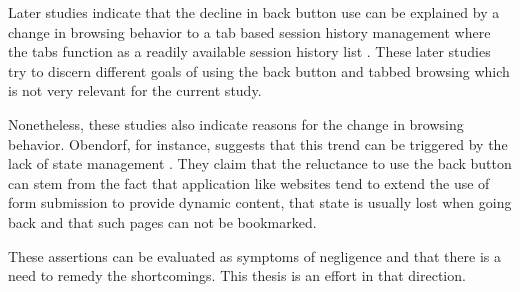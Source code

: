 \documentclass[english]{ifimaster}
\begin{document}
Later studies indicate that the decline in back button use can be explained by a change in browsing behavior to a tab based session history management where the tabs function as a readily available session history list \parencite{obendorf} \parencite{zhang}. These later studies try to discern different goals of using the back button and tabbed browsing which is not very relevant for the current study. 

Nonetheless, these studies also indicate reasons for the change in browsing behavior. Obendorf, for instance, suggests that this trend can be triggered by the lack of state management \parencite{obendorf}. They claim that the reluctance to use the back button can stem from the fact that application like websites tend to extend the use of form submission to provide dynamic content, that state is usually lost when going back and that such pages can not be bookmarked.

These assertions can be evaluated as symptoms of negligence and that there is a need to remedy the shortcomings. This thesis is an effort in that direction.


 












\end{document}
